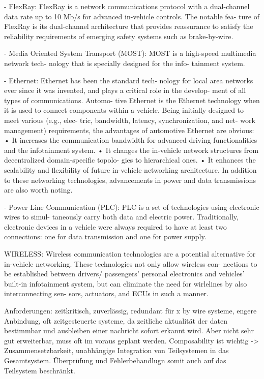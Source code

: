 - FlexRay: FlexRay is a network communications
protocol with a dual-channel data rate up to 10 Mb/s
for advanced in-vehicle controls. The notable fea-
ture of FlexRay is its dual-channel architecture
that provides reassurance to satisfy the reliability
requirements of emerging safety systems such
as brake-by-wire.

- Media Oriented System Transport (MOST):
MOST is a high-speed multimedia network tech-
nology that is specially designed for the info-
tainment system.

- Ethernet: Ethernet has been the standard tech-
nology for local area networks ever since it was
invented, and plays a critical role in the develop-
ment of all types of communications. Automo-
tive Ethernet is the Ethernet technology when it
is used to connect components within a vehicle.
Being initially designed to meet various (e.g., elec-
tric, bandwidth, latency, synchronization, and net-
work management) requirements, the advantages
of automotive Ethernet are obvious:
• It increases the communication bandwidth
for advanced driving functionalities and the
infotainment system.
• It changes the in-vehicle network structures
from decentralized domain-specific topolo-
gies to hierarchical ones.
• It enhances the scalability and flexibility of
future in-vehicle networking architecture.
In addition to these networking technologies,
advancements in power and data transmissions
are also worth noting.

- Power Line Communication (PLC): PLC is a
set of technologies using electronic wires to simul-
taneously carry both data and electric power.
Traditionally, electronic devices in a vehicle were
always required to have at least two connections: 
one for data transmission and one for power supply.

WIRELESS: Wireless communication technologies are a
potential alternative for in-vehicle networking.
These technologies not only allow wireless con-
nections to be established between drivers/
passengers’ personal electronics and vehicles’
built-in infotainment system, but can eliminate the
need for wirlelines by also interconnecting sen-
sors, actuators, and ECUs in such a manner.

Anforderungen:
zeitkritisch, zuverlässig, redundant für x by wire systeme,
engere Anbindung, oft zeitgesteuerte systeme, da zeitliche aktualität 
der daten bestimmbar und ausbleiben einer nachricht sofort erkannt wird.
Aber nicht sehr gut erweiterbar, muss oft im voraus geplant werden. 
Composability ist wichtig -> Zusammensetzbarkeit, unabhängige Integration
von Teilsystemen in das Gesamtsystem. Überprüfung und Fehlerbehandlugn somit
auch auf das Teilsystem beschränkt.

